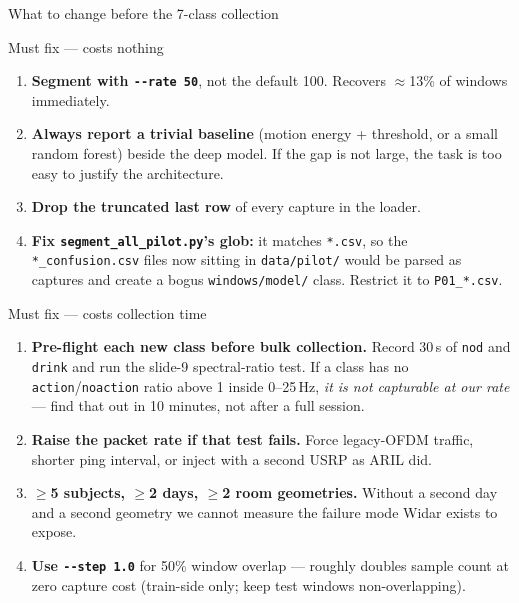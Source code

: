 \documentclass[aspectratio=169,10pt]{beamer}
\begin{document}
\begin{frame}{What to change before the 7-class collection}
\footnotesize
\begin{block}{\small Must fix --- costs nothing}
\scriptsize
\begin{enumerate}\itemsep1pt
\item \textbf{Segment with \texttt{-{}-rate 50}}, not the default 100. Recovers $\approx$13\% of windows immediately.
\item \textbf{Always report a trivial baseline} (motion energy + threshold, or a small
random forest) beside the deep model. If the gap is not large, the task is too easy to
justify the architecture.
\item \textbf{Drop the truncated last row} of every capture in the loader.
\item \textbf{Fix \texttt{segment\_all\_pilot.py}'s glob:} it matches \texttt{*.csv}, so the
\texttt{*\_confusion.csv} files now sitting in \texttt{data/pilot/} would be parsed as captures and
create a bogus \texttt{windows/model/} class. Restrict it to \texttt{P01\_*.csv}.
\end{enumerate}
\end{block}

\begin{block}{\small Must fix --- costs collection time}
\scriptsize
\begin{enumerate}\itemsep1pt\setcounter{enumi}{4}
\item \textbf{Pre-flight each new class before bulk collection.} Record 30\,s of \texttt{nod} and
\texttt{drink} and run the slide-9 spectral-ratio test. If a class has no
\texttt{action}/\texttt{noaction} ratio above 1 inside 0--25\,Hz, \emph{it is not
capturable at our rate} --- find that out in 10 minutes, not after a full session.
\item \textbf{Raise the packet rate if that test fails.} Force legacy-OFDM traffic,
shorter ping interval, or inject with a second USRP as ARIL did.
\item \textbf{$\ge$5 subjects, $\ge$2 days, $\ge$2 room geometries.} Without a second day
and a second geometry we cannot measure the failure mode Widar exists to expose.
\item \textbf{Use \texttt{-{}-step 1.0}} for 50\% window overlap --- roughly doubles sample count
at zero capture cost (train-side only; keep test windows non-overlapping).
\end{enumerate}
\end{block}
\end{frame}
\end{document}
